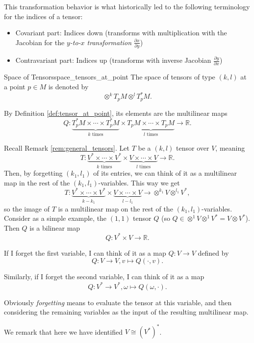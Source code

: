 This transformation behavior is what historically led to the following terminology for the indices of a tensor:
\begin{itemize}
\item Covariant part: Indices down (transforms with multiplication with the Jacobian for the \emph{$y$-to-$x$ transformation} $\frac{\partial x}{\partial y}$)
\item Contravariant part: Indices up (transforms with inverse Jacobian $\frac{\partial y}{\partial x}$)
\end{itemize}

\begin{colordef}{Space of Tensors}{space_tensors_at_point}
The space of tensors of type $(k, l)$ at a point $p \in M$ is denoted by
$$\otimes^k T_pM\otimes ^l T_p^*M.$$
\end{colordef}
By Definition \ref{def:tensor_at_point}, its elements are the multilinear maps 
$$Q: \underbrace{T_p^* M \times \cdots \times T_p^* M}_{k \text{ times}} \times \underbrace{T_p M \times \cdots \times T_p M}_{l \text{ times}} \longrightarrow \mathbb{R}.$$

\begin{colremark}
Recall Remark \ref{rem:general_tensors}. Let $T$ be a $(k,l)$ tensor over $V$, meaning $$T: \underbrace{V^* \times \cdots \times V^*}_{k \text{ times}} \times \underbrace{V \times \cdots \times V}_{l \text{ times}} \longrightarrow \mathbb{R}.$$
Then, by forgetting $(k_1,l_1)$ of its entries, we can think of it as a multilinear map in the rest of the $(k_1,l_1)$-variables. This way we get
$$
T:\underbrace{V^* \times \cdots \times V^*}_{k-k_1} \times \underbrace{V \times \cdots \times V}_{l-l_1} \longrightarrow \otimes^{k_1}V\otimes^{l_1}V^*,$$
so the image of $T$ is a multilinear map on the rest of the $(k_1,l_1)$-variables.\\

Consider as a simple example, the $(1,1)$ tensor $Q$ (so $Q\in \otimes^1 V \otimes^1 V^* = V \otimes V^*$). Then $Q$ is a bilinear map
$$Q: V^* \times V \to \mathbb{R}.$$

If I forget the first variable, I can think of it as a map $Q: V \to V$ defined by
$$Q: V \to V, v\mapsto Q(\cdot,v).$$


Similarly, if I forget the second variable, I can think of it as a map
$$Q: V^* \to V^*, \omega\mapsto Q(\omega,\cdot).$$

Obviously \emph{forgetting} means to evaluate the tensor at this variable, and then considering the remaining variables as the input of the resulting multilinear map.

We remark that here we have identified $V\cong (V^*)^*$.
\end{colremark}



